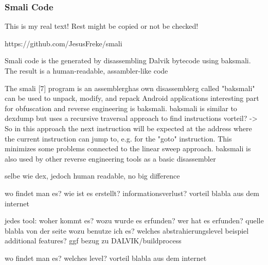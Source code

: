 \subsubsection{Smali Code}\label{subsubsection:tools-baksmali}
This is my real text! Rest might be copied or not be checked!


https://github.com/JesusFreke/smali

Smali code is the generated by disassembling Dalvik bytecode using baksmali. The result is a human-readable, assambler-like code

The smali [7] program is an \gls{assemblerg}has own \gls{disassemblerg} called "baksmali"\newline
can be used to unpack, modify, and repack Android applications\newline
interesting part for obfuscation and reverse engineering is baksmali. baksmali is similar to dexdump but uses a recursive traversal approach to find instructions\newline
vorteil? -> So in this approach the next instruction will be expected at the address where the current instruction can jump to, e.g. for the "goto" instruction. This minimizes some problems connected to the linear sweep approach. baksmali is also used by other reverse engineering tools as a basic disassembler\newline

selbe wie dex, jedoch human readable, no big difference

wo findet man es?\newline
wie ist es erstellt?\newline
informationsverlust?\newline
vorteil\newline
blabla aus dem internet\newline

jedes tool:\newline
woher kommt es?\newline
wozu wurde es erfunden?\newline
wer hat es erfunden? quelle\newline
blabla von der seite\newline
wozu benutze ich es?\newline
welches abstrahierungslevel\newline
beispiel\newline
additional features?\newline
ggf bezug zu DALVIK/buildprocess\newline

wo findet man es?\newline
welches level?\newline
vorteil\newline
blabla aus dem internet\newline
